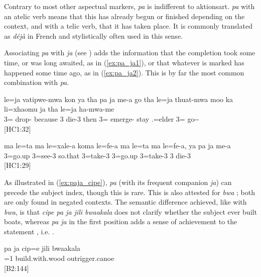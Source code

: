 Contrary to most other aspectual markers, \textit{pa} is indifferent to aktionsart. \textit{pa} with an atelic verb means that this has already begun or finished depending on the context, and with a telic verb, that it has taken place. It is commonly translated as \textit{déjà}  in French and stylistically often used in this sense. 
 
 Associating \textit{pa} with \textit{ja}  (see ) adds the information that the completion took some time, or was long awaited, as in (\ref{ex:pa_ja1}), or that whatever is marked has happened some time ago, as in (\ref{ex:pa_ja2}). This is by far the most common combination with \textit{pa}.
 

 \ea \label{ex:pa_ja1}
 \gll le=ja vatipwe-mwa kon ya tha pa ja me-a go tha le=ja thuat-mwa moo ka li=xhaomu ja tha le=ja ha-mwa-me \\
  3= drop- because 3    die-3 then  3= emerge- stay  .=elder   3= go--\\
 \glt  {} {[HC1:32]}
  \z
 
 
 \ea\label{ex:pa_ja2}
 \gll ma le=ta ma le=xale-a koma le=fe-a ma le=ta ma le=fe-a, ya pa ja me-a  \\
   3=go.up  3=see-3 so.that 3=take-3  3=go.up  3=take-3 3   die-3 \\
\glt {} {[HC1:29]} 
 \z

As illustrated in (\ref{ex:paja_cipe}), \textit{pa} (with its frequent companion \textit{ja}) can precede the subject index, though this is rare. This is also attested for \textit{bwa} ; both are only found in negated contexts. The semantic difference achieved, like with \textit{bwa}, is that \textit{cipe pa ja jili bwaakala}  does not clarify whether the subject ever built boats, whereas \textit{pa ja} in the first position adds a sense of achievement to the statement , i.e. .

\ea \label{ex:paja_cipe}
\gll pa ja cip=e jili bwaakala\\
   =1 build.with.wood outrigger.canoe\\
\glt {} [B2:144]
\z

